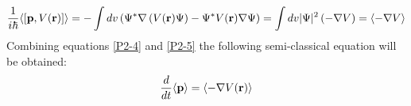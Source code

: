 \begin{homeworkProblem}
\begin{equation}\label{P2-5}
\frac{1}{i\hbar}\langle\left[\mathbf{p},V(\mathbf{r})\right]\rangle=-\int dv\left(\Psi^*\nabla \left(V(\mathbf{r})\Psi\right)- \Psi^* V(\mathbf{r})\nabla\Psi\right)=\int dv \lvert\Psi\rvert^2\left(-\nabla V\right)=\langle-\nabla V\rangle
\end{equation} 
Combining equations \eqref{P2-4} and \eqref{P2-5} the following semi-classical equation will be obtained:
\begin{equation}
\frac{d}{dt}\langle\mathbf{p}\rangle=\langle-\nabla V(\mathbf{r})\rangle
\end{equation}


\end{homeworkProblem}
  